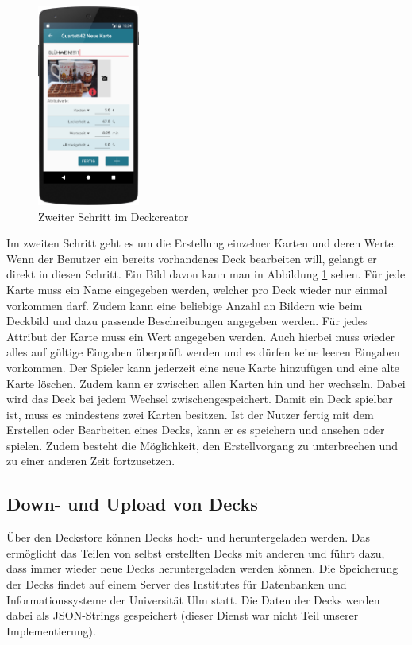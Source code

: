 \begin{figure}[htp]
	\centering
  	\includegraphics[width=0.3\textwidth]{img/screenshots/device_new_card.png}
	\caption{Zweiter Schritt im Deckcreator}
	\label{figure:implementierungdeckeditor}
\end{figure}

Im zweiten Schritt geht es um die Erstellung einzelner Karten und deren Werte. Wenn der Benutzer ein bereits vorhandenes Deck bearbeiten will, gelangt er direkt in diesen Schritt. Ein Bild davon kann man in Abbildung \ref{figure:implementierungdeckeditor} sehen. Für jede Karte muss ein Name eingegeben werden, welcher pro Deck wieder nur einmal vorkommen darf. Zudem kann eine beliebige Anzahl an Bildern wie beim Deckbild und dazu passende Beschreibungen angegeben werden. Für jedes Attribut der Karte muss ein Wert angegeben werden. Auch hierbei muss wieder alles auf gültige Eingaben überprüft werden und es dürfen keine leeren Eingaben vorkommen. Der Spieler kann jederzeit eine neue Karte hinzufügen und eine alte Karte löschen. Zudem kann er zwischen allen Karten hin und her wechseln. Dabei wird das Deck bei jedem Wechsel zwischengespeichert. Damit ein Deck spielbar ist, muss es mindestens zwei Karten besitzen. Ist der Nutzer fertig mit dem Erstellen oder Bearbeiten eines Decks, kann er es speichern und ansehen oder spielen. Zudem besteht die Möglichkeit, den Erstellvorgang zu unterbrechen und zu einer anderen Zeit fortzusetzen.

\subsection{Down- und Upload von Decks}
\label{sec:implementierung:besonderheiten:deckdownload }

Über den Deckstore können Decks hoch- und heruntergeladen werden. Das ermöglicht das Teilen von selbst erstellten Decks mit anderen und führt dazu, dass immer wieder neue Decks heruntergeladen werden können. Die Speicherung der Decks findet auf einem Server des Institutes für Datenbanken und Informationssysteme der Universität Ulm statt. Die Daten der Decks werden dabei als JSON-Strings gespeichert (dieser Dienst war nicht Teil unserer Implementierung).

